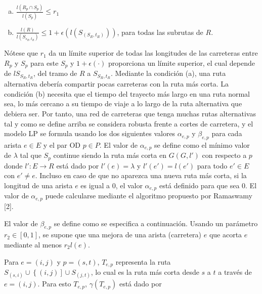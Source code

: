 \documentclass[10pt]{report}
\begin{document}
\begin{enumerate}[(a)]
	\item $\frac{l\left(R_{p} \cap S_{p}\right)}{l \left(S_{p}\right)} \leq r_{1}$ 
	\item $\frac{l\left(R\right)}
	            {l\left(S_{s_{R},t_{R}}\right)} \leq 1 + \epsilon \left( l \left( S_{\left( S_{R},t_{R}\right)} \right)  \right)$, para todas las subrutas de $R$.
\end{enumerate}

Nótese que $r_{1}$ da un límite superior de todas las longitudes de las carreteras entre $R_{p}$ y $S_{p}$ para este $S_{p}$ y $1+\epsilon \left( \cdot \right) $ proporciona un límite superior, el cual depende de $lS_{S_{R},t_{R}}$,  del tramo de $R$ a $S_{S_{R},t_{R}}$. Mediante la condición (a), una ruta alternativa debería compartir pocas carreteras con la ruta más corta. La condición (b) necesita que el tiempo del trayecto más largo en una ruta normal sea, lo más cercano a su tiempo de viaje a lo largo de la ruta alternativa que debiera ser.
Por tanto, una red de carreteras que tenga muchas rutas alternativas tal y como se define arriba se considera robusta frente a cortes de carretera, y el modelo LP se formula usando los dos siguientes valores $\alpha_{e,p}$ y   $\beta_{e,p}$ para cada arista $e \in E$ y el par OD $p \in P$. El valor de $\alpha_{e,p}$ se define como el mínimo valor de $\lambda$ tal que $S_{p}$ continue siendo la ruta más corta en $G\left( G, l'\right)$ con respecto a $p$ donde $l': E \longrightarrow R$ está dado por $l'\left( e\right) = \lambda$ y $l'\left( e'\right) =  l\left( e'\right)$ para todo $e' \in E$ con $e'\neq e$. Incluso en caso de que no aparezca una nueva ruta más corta, si la longitud de una arista $e$ es igual a $0$, el valor $\alpha_{e,p}$ está definido para que sea 0. El valor de $\alpha_{e,p}$ puede calcularse mediante el algoritmo propuesto por Ramaswamy [2].

El valor de $\beta_{e,p}$ se define como se especifica a continuación. Usando un parámetro $r_{2} \in \left[ 0,1 \right]$, se supone que una mejora de una arista (carretera) $e$ que acorta $e$ mediante al menos $r_{2}l\left( e\right)$.

Para $e = \left( i , j\right)$ y $p = \left( s , t\right)$, $T_{e,p}$ representa la ruta $S_{\left(s, i\right)} \cup \left\{ \left(i,j \right) \right]\cup S_{\left(j, t\right)} $, lo cual es la ruta más corta desde $s$ a $t$ a través de $e = \left(i,j \right)$. Para esto $T_{e,p}$, $\gamma\left(T_{e,p}\right)$  está dado por
\end{document}
